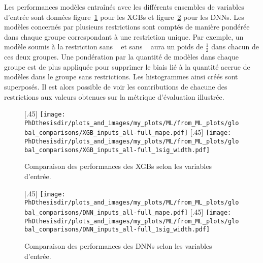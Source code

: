 \par
Les performances modèles entraînés avec les différents ensembles de variables d'entrée sont données
figure~\ref{fig-XGB_inputs} pour les XGBs
et
figure~\ref{fig-DNN_inputs}
pour les DNNs.
Les modèles concernés par plusieurs restrictions sont comptés de manière pondérée dans chaque groupe correspondant à une restriction unique.
Par exemple, un modèle soumis à la restriction \og sans \Npu\ \fg{} et \og sans \Nnu\ \fg{} aura un poids de $\frac{1}{2}$ dans chacun de ces deux groupes.
Une pondération par la quantité de modèles dans chaque groupe est de plus appliquée pour supprimer le biais lié à la quantité accrue de modèles dans le groupe sans restrictions.
Les histogrammes ainsi créés sont superposés.
Il est alors possible de voir les contributions de chacune des restrictions aux valeurs obtenues sur la métrique d'évaluation illustrée.
\begin{figure}[h]
\centering

\subcaptionbox{\label{subfig-XGB_inputs-mape}}[.45\textwidth]
{\texttt{[image: \\PhDthesisdir/plots\_and\_images/my\_plots/ML/from\_ML\_plots/global\_comparisons/XGB\_inputs\_all-full\_mape.pdf]}\vspace{-\baselineskip}}
\hfill
\subcaptionbox{\label{subfig-XGB_inputs-1sigw}}[.45\textwidth]
{\texttt{[image: \\PhDthesisdir/plots\_and\_images/my\_plots/ML/from\_ML\_plots/global\_comparisons/XGB\_inputs\_all-full\_1sig\_width.pdf]}\vspace{-\baselineskip}}

\caption{Comparaison des performances des XGBs selon les variables d'entrée.}
\label{fig-XGB_inputs}
\end{figure}
\begin{figure}[h]
\centering

\subcaptionbox{\label{subfig-DNN_inputs-mape}}[.45\textwidth]
{\texttt{[image: \\PhDthesisdir/plots\_and\_images/my\_plots/ML/from\_ML\_plots/global\_comparisons/DNN\_inputs\_all-full\_mape.pdf]}\vspace{-\baselineskip}}
\hfill
\subcaptionbox{\label{subfig-DNN_inputs-1sigw}}[.45\textwidth]
{\texttt{[image: \\PhDthesisdir/plots\_and\_images/my\_plots/ML/from\_ML\_plots/global\_comparisons/DNN\_inputs\_all-full\_1sig\_width.pdf]}\vspace{-\baselineskip}}

\caption{Comparaison des performances des DNNs selon les variables d'entrée.}
\label{fig-DNN_inputs}
\end{figure}
